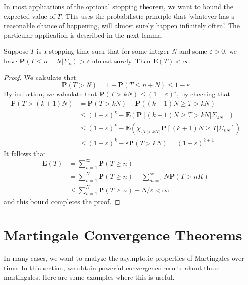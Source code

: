 In most applications of the optional stopping theorem, we want to bound the expected value of $T$. This uses the probabilistic principle that `whatever has a reasonable chance of happening, will almost surely happen infinitely often'. The particular application is described in the next lemma.

\begin{lemma}
    Suppose $T$ is a stopping time such that for some integer $N$ and some $\varepsilon > 0$, we have $\mathbf{P}(T \leq n + N | \Sigma_n) > \varepsilon$ almost surely. Then $\mathbf{E}(T) < \infty$.
\end{lemma}
\begin{proof}
    We calculate that
    \[ \mathbf{P}(T > N) = 1 - \mathbf{P}(T \leq n + N) \leq 1 - \varepsilon \]
    By induction, we calculate that $\mathbf{P}(T > kN) \leq (1 - \varepsilon)^k$, by checking that
    \begin{align*}
        \mathbf{P}(T > (k+1)N) &= \mathbf{P}(T > kN) - \mathbf{P}((k+1)N \geq T > kN)\\
        &\leq (1 - \varepsilon)^k - \mathbf{E}(\mathbf{P}[(k+1)N \geq T > kN | \Sigma_{kN} ])\\
        &\leq (1 - \varepsilon)^k - \mathbf{E} \left( \chi_{\{ T > kN \}} \mathbf{P}[(k+1)N \geq T | \Sigma_{kN}] \right)\\
        &\leq (1 - \varepsilon)^k - \varepsilon \mathbf{P}(T > kN) = (1 - \varepsilon)^{k+1}
    \end{align*}
    It follows that
    \begin{align*}
        \mathbf{E}(T) &= \sum_{n = 1}^\infty \mathbf{P}(T \geq n)\\
        &= \sum_{n = 1}^N \mathbf{P}(T \geq n) + \sum_{m = 1}^\infty N \mathbf{P}(T > nK)\\
        &\leq \sum_{n = 1}^N \mathbf{P}(T \geq n) + N/\varepsilon < \infty
    \end{align*}
    and this bound completes the proof.
\end{proof}

\section{Martingale Convergence Theorems}

In many cases, we want to analyze the asymptotic properties of Martingales over time. In this section, we obtain powerful convergence results about these martingales. Here are some examples where this is useful.

